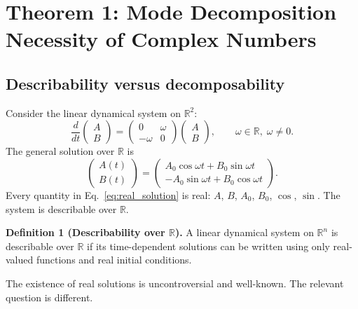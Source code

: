 \documentclass[aps,pra,preprint,groupedaddress,amsmath,amssymb,floatfix]{revtex4-2}
\begin{document}
\section{Theorem 1: Mode Decomposition Necessity of Complex Numbers}
\label{sec:theorem1}

\subsection{Describability versus decomposability}
\label{sec:th1_describability}

Consider the linear dynamical system on $\mathbb{R}^2$:
\begin{equation}
\frac{d}{dt}\begin{pmatrix} A \\ B \end{pmatrix}
= \begin{pmatrix} 0 & \omega \\ -\omega & 0 \end{pmatrix}
\begin{pmatrix} A \\ B \end{pmatrix},
\qquad \omega \in \mathbb{R},\; \omega \neq 0. \label{eq:M_system}
\end{equation}
The general solution over $\mathbb{R}$ is
\begin{equation}
\begin{pmatrix} A(t) \\ B(t) \end{pmatrix} =
\begin{pmatrix} A_0\cos\omega t + B_0\sin\omega t \\
-A_0\sin\omega t + B_0\cos\omega t \end{pmatrix}. \label{eq:real_solution}
\end{equation}
Every quantity in Eq.~\eqref{eq:real_solution} is real: $A$, $B$, $A_0$, $B_0$, $\cos$, $\sin$. The system is describable over $\mathbb{R}$.

\textbf{Definition 1 (Describability over $\mathbb{R}$).} A linear dynamical system on $\mathbb{R}^n$ is describable over $\mathbb{R}$ if its time-dependent solutions can be written using only real-valued functions and real initial conditions.

The existence of real solutions is uncontroversial and well-known. The relevant question is different.
\end{document}
